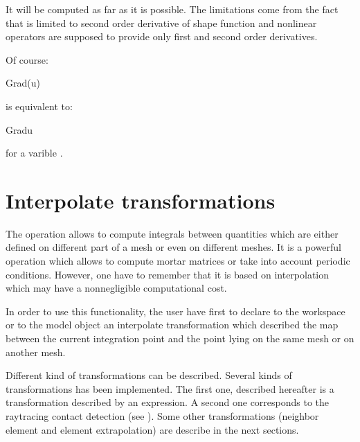 \documentclass[a4paper,11pt,english]{sphinxmanual}
\begin{document}
It will be computed as far as it is possible. The limitations come from the fact that  is limited to second order derivative of shape function and nonlinear operators are supposed to provide only first and second order derivatives.

Of course:

\begin{sphinxVerbatim}[commandchars=\\\{\}]
Grad(u)
\end{sphinxVerbatim}

is equivalent to:

\begin{sphinxVerbatim}[commandchars=\\\{\}]
Grad\PYGZus{}u
\end{sphinxVerbatim}

for a varible .


\section{Interpolate transformations}
\label{\detokenize{userdoc/gasm_high:interpolate-transformations}}\label{\detokenize{userdoc/gasm_high:ud-gasm-high-transf}}
The  operation allows to compute integrals between quantities which are either defined on different part of a mesh or even on different meshes. It is a powerful operation which allows to compute mortar matrices or take into account periodic conditions. However, one have to remember that it is based on interpolation which may have a non\sphinxhyphen{}negligible computational cost.

In order to use this functionality, the user have first to declare to the workspace or to the model object an interpolate transformation which described the map between the current integration point and the point lying on the same mesh or on another mesh.

Different kind of transformations can be described. Several kinds of transformations has been implemented. The first one, described hereafter is a transformation described by an expression. A second one corresponds to the raytracing contact detection (see {\hyperref[\detokenize{userdoc/model_contact_friction_large_sliding:ud-model-contact-friction-raytrace-inter-trans}]{}}). Some other transformations (neighbor element and element extrapolation) are describe in the next sections.
\end{document}
